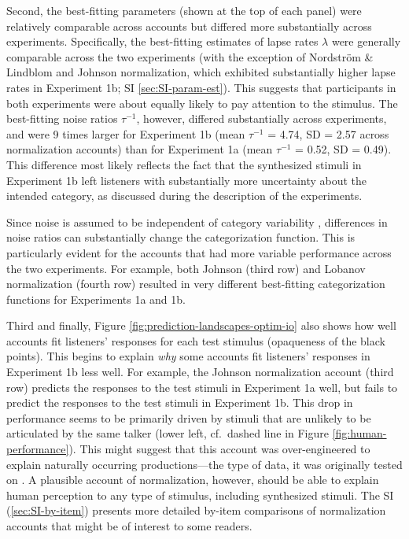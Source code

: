 \documentclass[preprint]{JASA}
\begin{document}
Second, the best-fitting parameters (shown at the top of each panel) were relatively comparable across accounts but differed more substantially across experiments. Specifically, the best-fitting estimates of lapse rates \(\lambda\) were generally comparable across the two experiments (with the exception of Nordström \& Lindblom and Johnson normalization, which exhibited substantially higher lapse rates in Experiment 1b; SI \ref{sec:SI-param-est}). This suggests that participants in both experiments were about equally likely to pay attention to the stimulus. The best-fitting noise ratios \(\tau^{-1}\), however, differed substantially across experiments, and were 9 times larger for Experiment 1b (mean \(\tau^{-1}\) = 4.74, SD = 2.57 across normalization accounts) than for Experiment 1a (mean \(\tau^{-1}\) = 0.52, SD = 0.49). This difference most likely reflects the fact that the synthesized stimuli in Experiment 1b left listeners with substantially more uncertainty about the intended category, as discussed during the description of the experiments.

Since noise is assumed to be independent of category variability \citep[see also][]{feldman2009, kronrod2016}, differences in noise ratios can substantially change the categorization function. This is particularly evident for the accounts that had more variable performance across the two experiments. For example, both Johnson (third row) and Lobanov normalization (fourth row) resulted in very different best-fitting categorization functions for Experiments 1a and 1b.

Third and finally, Figure \ref{fig:prediction-landscapes-optim-io} also shows how well accounts fit listeners' responses for each test stimulus (opaqueness of the black points). This begins to explain \emph{why} some accounts fit listeners' responses in Experiment 1b less well. For example, the Johnson normalization account (third row) predicts the responses to the test stimuli in Experiment 1a well, but fails to predict the responses to the test stimuli in Experiment 1b. This drop in performance seems to be primarily driven by stimuli that are unlikely to be articulated by the same talker (lower left, cf.~dashed line in Figure \ref{fig:human-performance}). This might suggest that this account was over-engineered to explain naturally occurring productions---the type of data, it was originally tested on \citep{johnson2020}. A plausible account of normalization, however, should be able to explain human perception to any type of stimulus, including synthesized stimuli. The SI (\ref{sec:SI-by-item}) presents more detailed by-item comparisons of normalization accounts that might be of interest to some readers.
\end{document}
